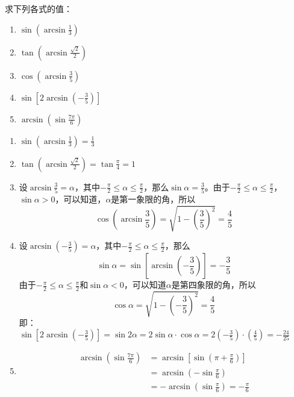 \begin{example}
    求下列各式的值：
\begin{multicols}{2}
\begin{enumerate}
    \item $\sin\left(\arcsin\frac{1}{3}\right)$
    \item $\tan\left(\arcsin\frac{\sqrt{2}}{2}\right)$
    \item $\cos\left(\arcsin\frac{3}{5}\right)$
    \item $\sin\left[2\arcsin\left(-\frac{3}{5}\right)\right]$
    \item $\arcsin\left(\sin\frac{7\pi}{6}\right)$
\end{enumerate}
\end{multicols}
\end{example}

\begin{solution}
\begin{enumerate}
    \item $\sin\left(\arcsin\frac{1}{3}\right)=\frac{1}{3}$
    \item $\tan\left(\arcsin\frac{\sqrt{2}}{2}\right)=\tan\frac{\pi}{4}=1$
    \item 设$\arcsin\frac{3}{5}=\alpha$，其中$-\frac{\pi}{2}\le\alpha\le\frac{\pi}{2}$，那么$\sin\alpha=\frac{3}{5}$。由于$-\frac{\pi}{2}\le\alpha\le\frac{\pi}{2}$，$\sin\alpha>0$，可以知道，$\alpha$是第一象限的角，所以
    $$\cos\left(\arcsin\frac{3}{5}\right)=\sqrt{1-\left(\frac{3}{5}\right)^2}=\frac{4}{5}$$
    \item 设$\arcsin\left(-\frac{3}{5}\right)=\alpha$，其中$-\frac{\pi}{2}\le\alpha\le\frac{\pi}{2}$，那么
    \[\sin\alpha =\sin\left[\arcsin\left(-\frac{3}{5}\right)\right]=-\frac{3}{5}\]
由于$-\frac{\pi}{2}\le\alpha\le\frac{\pi}{2}$和$\sin\alpha<0$，可以知道$\alpha$是第四象限的角，所以
\[\cos\alpha=\sqrt{1-\left(-\frac{3}{5}\right)^2}=\frac{4}{5}\]
即：
$\sin\left[2\arcsin\left(-\frac{3}{5}\right)\right]=\sin2\alpha=2\sin\alpha\cdot \cos\alpha=2\left(-\frac{3}{5}\right)\cdot\left(\frac{4}{5}\right)=-\frac{24}{25}$
    \item \[\begin{split}
\arcsin\left(\sin\frac{7\pi}{6}\right)&=\arcsin\left[\sin\left(\pi+\frac{\pi}{6}\right)\right]\\
&=\arcsin\left(-\sin\frac{\pi}{6}\right)\\
&=-\arcsin\left(\sin\frac{\pi}{6}\right)=-\frac{\pi}{6}        
    \end{split}\]
\end{enumerate}
\end{solution}

